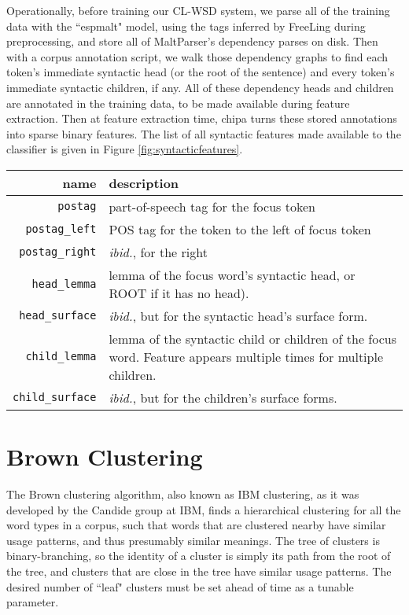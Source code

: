 Operationally, before training our CL-WSD system, we parse all of the training
data with the ``espmalt" model, using the tags inferred by FreeLing during
preprocessing, and store all of MaltParser's dependency parses on disk.
Then with a corpus annotation script, we walk those dependency
graphs to find each token's immediate syntactic head (or the root of the
sentence) and every token's immediate syntactic children, if any. All of these
dependency heads and children are annotated in the training data, to be made
available during feature extraction. Then at feature extraction time, chipa
turns these stored annotations into sparse binary features. The list of all
syntactic features made available to the classifier is given in Figure
\ref{fig:syntacticfeatures}.

\begin{figure*}
  \begin{centering}
  \begin{tabular}{|r|p{11cm}|}
    \hline
    name          & description  \\
    \hline
    \texttt{postag}    & part-of-speech tag for the focus token \\
    \hline
    \texttt{postag\_left}  & POS tag for the token to the left of focus token \\
    \hline
    \texttt{postag\_right} & \emph{ibid.}, for the right \\
    \hline
    \texttt{head\_lemma} & lemma of the focus word's syntactic head, or ROOT if
    it has no head). \\
    \hline
    \texttt{head\_surface} & \emph{ibid.}, but for the syntactic head's surface
    form. \\
    \hline
    \texttt{child\_lemma} & lemma of the syntactic child or children of the
    focus word. Feature appears multiple times for multiple children. \\
    \hline
    \texttt{child\_surface} & \emph{ibid.}, but for the children's surface
    forms. \\
    \hline
  \end{tabular}
  \end{centering}
  \caption{Additional syntactic features}
  \label{fig:syntacticfeatures}
\end{figure*}

\section{Brown Clustering}
The Brown clustering algorithm\cite{brown1992class}, also known as IBM
clustering, as it was developed by the Candide group at IBM, finds a
hierarchical clustering for all the word types in a corpus, such that words
that are clustered nearby have similar usage patterns, and thus presumably
similar meanings.
The tree of clusters is binary-branching, so the identity of a cluster is
simply its path from the root of the tree, and clusters that are close in the
tree have similar usage patterns. The desired number of ``leaf" clusters must
be set ahead of time as a tunable parameter.

